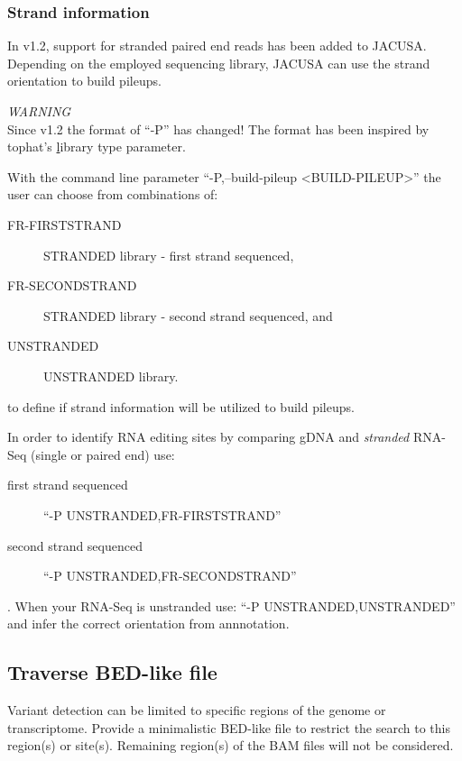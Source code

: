 \documentclass[10pt, a4paper]{article}
\begin{document}
\subsubsection{Strand information}
In v1.2, support for stranded paired end reads has been added to JACUSA. Depending on the employed sequencing library, 
JACUSA can use the strand orientation to build pileups.

\begin{center}
\emph{WARNING} \\
Since v1.2 the format of ``-P'' has changed!
The format has been inspired by tophat's \href{http://ccb.jhu.edu/software/tophat/manual.shtml} library type parameter. 
\end{center}

With the command line parameter ``-P,--build-pileup <BUILD-PILEUP>'' the user can choose from combinations of:
\begin{description} 
\item[FR-FIRSTSTRAND] STRANDED library - first strand sequenced,
\item[FR-SECONDSTRAND] STRANDED library - second strand sequenced, and
\item[UNSTRANDED] UNSTRANDED library.
\end{description}
to define if strand information will be utilized to build pileups.

In order to identify RNA editing sites by comparing gDNA and \emph{stranded} RNA-Seq (single or paired end) use:
\begin{description} 
\item[first strand sequenced] ``-P UNSTRANDED,FR-FIRSTSTRAND''
\item[second strand sequenced] ``-P UNSTRANDED,FR-SECONDSTRAND''
\end{description}.
When your RNA-Seq is unstranded use: ``-P UNSTRANDED,UNSTRANDED'' and infer the correct orientation from annnotation.
\subsection{Traverse BED-like file}
Variant detection can be limited to specific regions of the genome or transcriptome.  Provide a
minimalistic BED-like file to restrict the search to this region(s) or site(s). Remaining region(s)
of the BAM files will not be considered.
\end{document}
